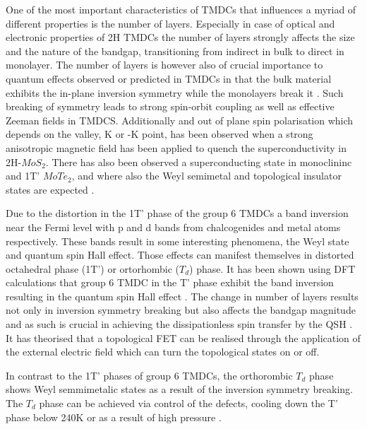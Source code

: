 One of the most important characteristics of TMDCs that influences a myriad of different properties is the number of layers. Especially in case of optical and electronic properties of 2H TMDCs the number of layers strongly affects the size and the nature of the bandgap, transitioning from indirect in bulk to direct in monolayer. The number of layers is however also of crucial importance to quantum effects observed or predicted in TMDCs in that the bulk material exhibits the in-plane inversion symmetry while the monolayers break it \cite{Saito2015}\cite{Lu2015}. Such breaking of symmetry leads to strong spin-orbit coupling as well as effective Zeeman fields in TMDCS. Additionally and out of plane spin polarisation which depends on the valley, K or -K point, has been observed when a strong anisotropic magnetic field has been applied to quench the superconductivity in 2H-$MoS_2$. There has also been observed a superconducting state in monoclininc and 1T' $MoTe_2$, and where also the Weyl semimetal and topological insulator states are expected \cite{Qian2014}\cite{Sun2015}\cite{Qi2016}.

Due to the distortion in the 1T' phase of the group 6 TMDCs a band inversion near the Fermi level with p and d bands from chalcogenides and metal atoms respectively. These bands result in some interesting phenomena, the Weyl state and quantum spin Hall effect. Those effects can manifest themselves in distorted octahedral phase (1T') or ortorhombic ($T_d$) phase. It has been shown using DFT calculations that group 6 TMDC in the T' phase exhibit the band inversion resulting in the quantum spin Hall effect \cite{Qian2014}\cite{Choe2016}. The change in number of layers results not only in inversion symmetry breaking but also affects the bandgap magnitude and as such is crucial in achieving the dissipationless spin transfer by the QSH \cite{Kane2005}\cite{Konig2007}. It has theorised that a topological FET can be realised through the application of the external electric field which can turn the topological states on or off.

In contrast to the 1T' phases of group 6 TMDCs, the orthorombic $T_d$ phase shows Weyl semmimetalic states as a result of the inversion symmetry breaking. The $T_d$ phase can be achieved via control of the defects, cooling down the T' phase below 240K or as a result of high pressure \cite{Qi2016}. 

